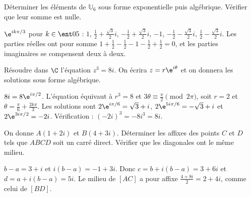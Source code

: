 \begin{exercise}
Déterminer les éléments de $\mathbb U_6$ sous forme exponentielle puis algébrique. Vérifier que leur somme est nulle.
\end{exercise}
\begin{solution}
$\e^{ik\pi/3}$ pour $k\in\ent05$ : $1$, $\frac12+\frac{\sqrt3}2i$, $-\frac12+\frac{\sqrt3}2i$, $-1$, $-\frac12-\frac{\sqrt3}2i$, $\frac12-\frac{\sqrt3}2i$. Les parties réelles ont pour somme $1+\frac12-\frac12-1-\frac12+\frac12=0$, et les parties imaginaires se compensent deux à deux.
\end{solution}

\begin{exercise}
Résoudre dans $\C$ l'équation $z^3=8i$. On écrira $z=r\e^{i\theta}$ et on donnera les solutions sous forme algébrique.
\end{exercise}
\begin{solution}
$8i=8\e^{i\pi/2}$. L'équation équivaut à $r^3=8$ et $3\theta\equiv\frac\pi2\pmod{2\pi}$, soit $r=2$ et $\theta=\frac\pi6+\frac{2k\pi}3$. Les solutions sont $2\e^{i\pi/6}=\sqrt3+i$, $2\e^{5i\pi/6}=-\sqrt3+i$ et $2\e^{3i\pi/2}=-2i$. Vérification : $(-2i)^3=-8i^3=8i$.
\end{solution}

\begin{exercise}
On donne $A(1+2i)$ et $B(4+3i)$. Déterminer les affixes des points $C$ et $D$ tels que $ABCD$ soit un carré direct. Vérifier que les diagonales ont le même milieu.
\end{exercise}
\begin{solution}
$b-a=3+i$ et $i(b-a)=-1+3i$. Donc $c=b+i(b-a)=3+6i$ et $d=a+i(b-a)=5i$. Le milieu de $[AC]$ a pour affixe $\frac{4+8i}2=2+4i$, comme celui de $[BD]$.
\end{solution}

